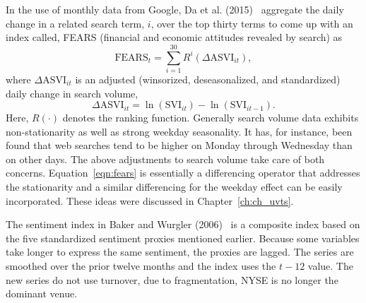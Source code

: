 In the use of monthly data from Google, Da et al. (2015)~\cite{da2015sum} aggregate the daily change in a related search term, $i$, over the top thirty terms to come up with an index called, FEARS (financial and economic attitudes revealed by search) as 
	\begin{equation} \label{eqn:fears}
	\text{FEARS}_t = \sum_{i=1}^{30} R^i (\Delta \text{ASVI}_{it}),
	\end{equation}
where $\Delta \text{ASVI}_{it}$ is an adjusted (winsorized, deseasonalized, and standardized) daily change in search volume, 
	\begin{equation}
	\Delta \text{ASVI}_{it} = \ln(\text{SVI}_{it}) - \ln(\text{SVI}_{it-1}).
	\end{equation}
Here, $R(\cdot)$ denotes the ranking function. Generally search volume data exhibits non-stationarity as well as strong weekday seasonality. It has, for instance, been found that web searches tend to be higher on Monday through Wednesday than on other days. The above adjustments to search volume take care of both concerns. Equation~\ref{eqn:fears} is essentially a differencing operator that addresses the stationarity and a similar differencing for the weekday effect can be easily incorporated. These ideas were discussed in Chapter~\ref{ch:ch_uvts}.


The sentiment index in Baker and Wurgler (2006)~\cite{baker2006investor} is a composite index based on the five standardized sentiment proxies mentioned earlier. Because some variables take longer to express the same sentiment, the proxies are lagged. The series are smoothed over the prior twelve months and the index uses the $t-12$ value. The new series do not use turnover, due to fragmentation, NYSE is no longer the dominant venue. 


